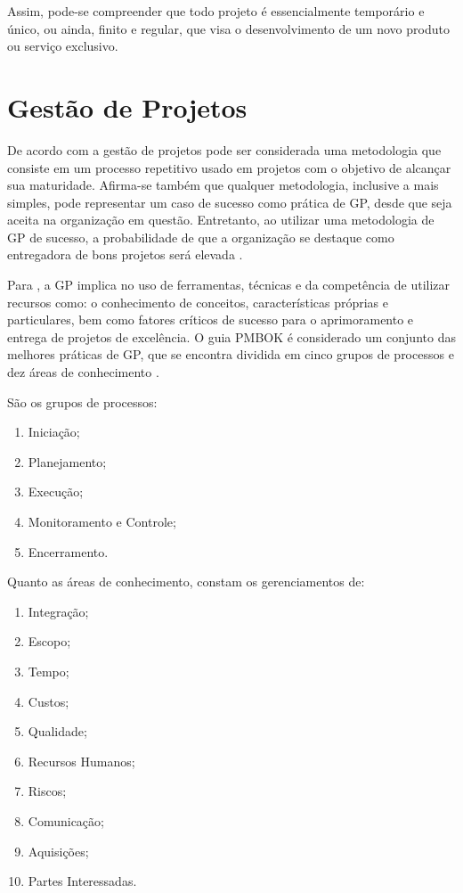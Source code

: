 Assim, pode-se compreender que todo projeto é essencialmente temporário e único, ou ainda, finito e regular, que visa o desenvolvimento de um novo produto ou serviço exclusivo.


\section{Gestão de Projetos}

De acordo com  a gestão de projetos pode ser considerada uma metodologia que consiste em um processo repetitivo usado em projetos com o objetivo de alcançar sua maturidade. Afirma-se também que qualquer metodologia, inclusive a mais simples, pode representar um caso de sucesso como prática de GP, desde que seja aceita na organização em questão. Entretanto, ao utilizar uma metodologia de GP de sucesso, a probabilidade de que a organização se destaque como entregadora de bons projetos será elevada \cite{kerzner2013project}.

Para , a GP implica no uso de ferramentas, técnicas e da competência de utilizar recursos como: o conhecimento de conceitos, características próprias e particulares, bem como fatores críticos de sucesso para o aprimoramento e entrega de projetos de excelência. O guia PMBOK é considerado um conjunto das melhores práticas de GP, que se encontra dividida em cinco grupos de processos e dez áreas de conhecimento \cite{pmiguide2014}.

São os grupos de processos:
\singlespacing
\begin{enumerate}
  \item Iniciação;
  \item Planejamento;
  \item Execução;
  \item Monitoramento e Controle;
  \item Encerramento.
\end{enumerate}
\onehalfspacing

Quanto as áreas de conhecimento, constam os gerenciamentos de:

\singlespacing
\begin{enumerate}
  \item Integração;
  \item Escopo;
  \item Tempo;
  \item Custos;
  \item Qualidade;
  \item Recursos Humanos;
  \item Riscos;
  \item Comunicação;
  \item Aquisições;
  \item Partes Interessadas.
\end{enumerate}
\onehalfspacing

